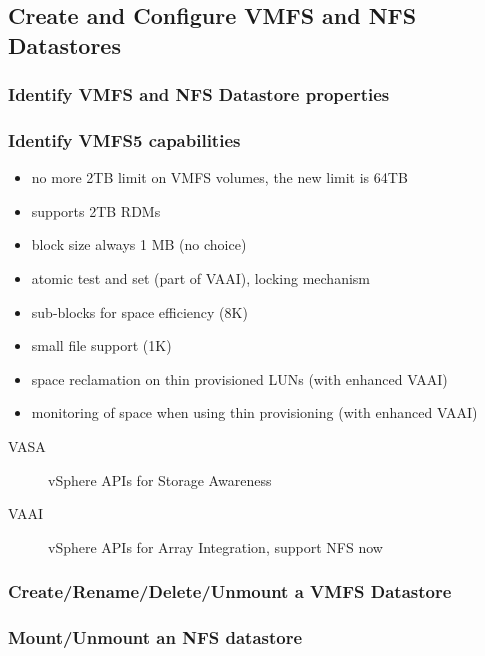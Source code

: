 \subsection{Create and Configure VMFS and NFS Datastores}

\subsubsection{Identify VMFS and NFS Datastore properties}

\subsubsection{Identify VMFS5 capabilities}

\begin{itemize}

\item no more 2TB limit on VMFS volumes, the new limit is 64TB
\item supports 2TB RDMs
\item block size always 1 MB (no choice)
\item atomic test and set (part of VAAI), locking mechanism
\item sub-blocks for space efficiency (8K)
\item small file support (1K)
\item space reclamation on thin provisioned LUNs (with enhanced VAAI)
\item monitoring of space when using thin provisioning (with enhanced VAAI)

\end{itemize}

\begin{description}

\item[VASA] vSphere APIs for Storage Awareness

\item[VAAI] vSphere APIs for Array Integration, support NFS now

\end{description}

\subsubsection{Create/Rename/Delete/Unmount a VMFS Datastore}

\subsubsection{Mount/Unmount an NFS datastore}

